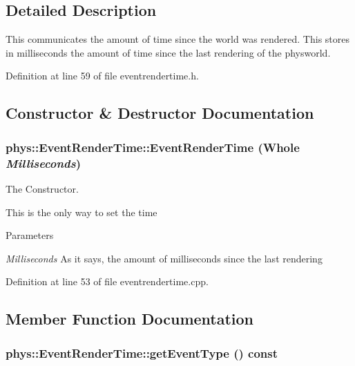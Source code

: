 \subsection{Detailed Description}
This communicates the amount of time since the world was rendered. This stores in milliseconds the amount of time since the last rendering of the physworld. 

Definition at line 59 of file eventrendertime.h.



\subsection{Constructor \& Destructor Documentation}
\hypertarget{classphys_1_1EventRenderTime_af2384f7b09bbea42dcd2539a9e1747fd}{
\subsubsection[{EventRenderTime}]{\setlength{\rightskip}{0pt plus 5cm}phys::EventRenderTime::EventRenderTime (Whole {\em Milliseconds})}}
\label{d3/d8b/classphys_1_1EventRenderTime_af2384f7b09bbea42dcd2539a9e1747fd}


The Constructor. 

This is the only way to set the time 
\begin{DoxyParams}{Parameters}
\item[{\em Milliseconds}]As it says, the amount of milliseconds since the last rendering \end{DoxyParams}


Definition at line 53 of file eventrendertime.cpp.



\subsection{Member Function Documentation}
\hypertarget{classphys_1_1EventRenderTime_a66918bf3793196899621e4442a6f7a57}{
\subsubsection[{getEventType}]{ phys::EventRenderTime::getEventType () const}}
\label{d3/d8b/classphys_1_1EventRenderTime_a66918bf3793196899621e4442a6f7a57}


